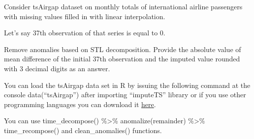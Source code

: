 
\begin{question}
Consider tsAirgap dataset on monthly totals of international airline passengers with missing values filled in with linear interpolation.

Let's say 37th observation of that series is equal to 0.

Remove anomalies based on STL decomposition. Provide the absolute value of mean difference of the initial 37th observation and the imputed value rounded with 3 decimal digits as an answer.

You can load the tsAirgap data set in R by issuing the following command at the console data(``tsAirgap'') after importing ``imputeTS'' library or if you use other programming languages you can download it \href{https://github.com/SteffenMoritz/imputeTS/blob/master/data/tsAirgap.rda}{here}.
\end{question}

\begin{solution}
You can use time\_decompose() \%\textgreater\% anomalize(remainder) \%\textgreater\% time\_recompose() and clean\_anomalies() functions.
\end{solution}

